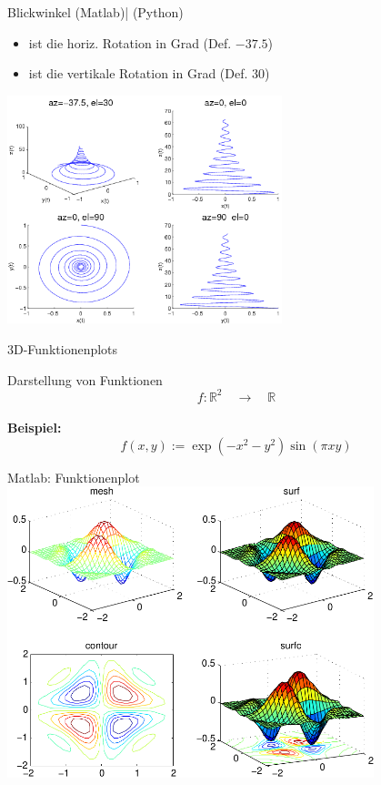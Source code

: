 \documentclass[hyperref={xetex}]{beamer}
\begin{document}
% 
% 
\begin{frame}[fragile]{Blickwinkel}
  \centering {}(Matlab)| (Python)
\begin{itemize}
\item \alert{ } ist die horiz. Rotation in Grad (Def. \alert{
  $-37.5$}) 
\item \alert{ } ist die vertikale Rotation in Grad (Def. \alert{
  $30$})
\end{itemize}
\begin{center}\includegraphics[width=0.6\textwidth]{figures/beispiel_plot3_2}\end{center}
\end{frame}
% 
% 
\begin{frame}[fragile]{3D-Funktionenplots}

Darstellung von Funktionen
\[ f: \mathbb{R}^2 \quad  \rightarrow \quad \mathbb{R} \]
\hspace*{1cm}\\

\textbf{Beispiel:}\\
\alert{ \[ f(x,y):=\exp(-x^2-y^2)\sin(\pi x y) \]}
\end{frame}
% 
% 
\begin{frame}[fragile]{Matlab: Funktionenplot}
\hfil\includegraphics[width=0.8\textwidth]{figures/beispiel_function_plot_3d}\hfil
\end{frame}
\end{document}

